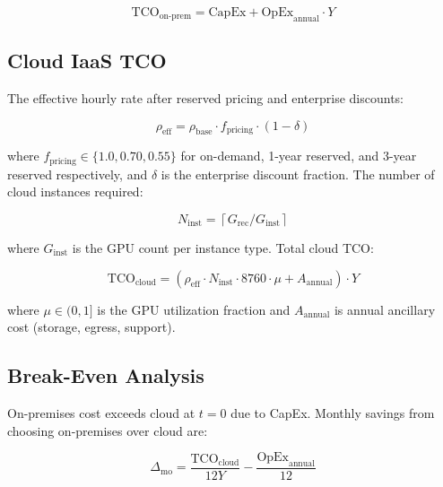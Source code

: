 \documentclass{article}
\begin{document}
\begin{equation}
  \text{TCO}_{\text{on-prem}} = \text{CapEx} + \text{OpEx}_{\text{annual}} \cdot Y
  \label{eq:onprem_tco}
\end{equation}

\subsection{Cloud IaaS TCO}
\label{sec:cloud_tco}

The effective hourly rate after reserved pricing and enterprise discounts:

\begin{equation}
  \rho_{\text{eff}} = \rho_{\text{base}} \cdot f_{\text{pricing}} \cdot (1 - \delta)
  \label{eq:cloud_rate}
\end{equation}

\noindent where $f_{\text{pricing}} \in \{1.0, 0.70, 0.55\}$ for on-demand,
1-year reserved, and 3-year reserved respectively, and $\delta$ is the
enterprise discount fraction. The number of cloud instances required:

\begin{equation}
  N_{\text{inst}} = \left\lceil G_{\text{rec}} / G_{\text{inst}} \right\rceil
  \label{eq:instances}
\end{equation}

\noindent where $G_{\text{inst}}$ is the GPU count per instance type.
Total cloud TCO:

\begin{equation}
  \text{TCO}_{\text{cloud}} = \left(\rho_{\text{eff}} \cdot N_{\text{inst}}
    \cdot 8760 \cdot \mu + A_{\text{annual}}\right) \cdot Y
  \label{eq:cloud_tco}
\end{equation}

\noindent where $\mu \in (0,1]$ is the GPU utilization fraction and
$A_{\text{annual}}$ is annual ancillary cost (storage, egress, support).

\subsection{Break-Even Analysis}
\label{sec:breakeven}

On-premises cost exceeds cloud at $t{=}0$ due to CapEx. Monthly savings from
choosing on-premises over cloud are:

\begin{equation}
  \Delta_{\text{mo}} = \frac{\text{TCO}_{\text{cloud}}}{12Y} -
    \frac{\text{OpEx}_{\text{annual}}}{12}
  \label{eq:monthly_savings}
\end{equation}
\end{document}
